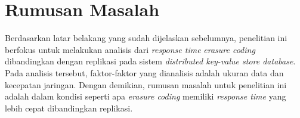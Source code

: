 \section{Rumusan Masalah}
\label{sec:rumusan-masalah}

Berdasarkan latar belakang yang sudah dijelaskan sebelumnya, penelitian ini berfokus untuk melakukan analisis dari \textit{response time} \textit{erasure coding} dibandingkan dengan replikasi pada sistem \textit{distributed key-value store database}. Pada analisis tersebut, faktor-faktor yang dianalisis adalah ukuran data dan kecepatan jaringan. Dengan demikian, rumusan masalah untuk penelitian ini adalah dalam kondisi seperti apa \textit{erasure coding} memiliki \textit{response time} yang lebih cepat dibandingkan replikasi.
